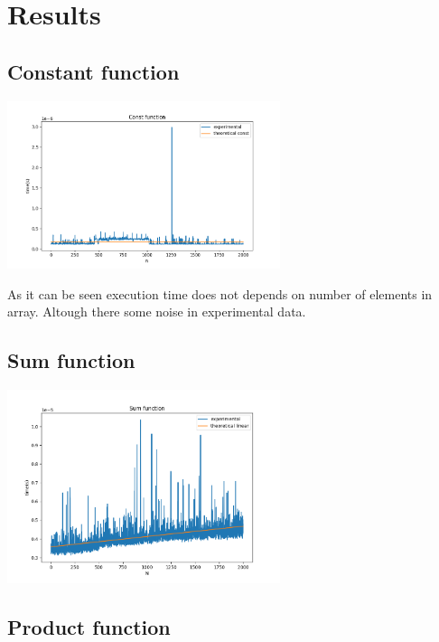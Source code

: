 \section*{Results}

\subsection*{Constant function}

\begin{center}
    \includegraphics[width=0.6\textwidth]{../results/const_f.png}
\end{center}

As it can be seen execution time does not depends on number of elements in array. Altough there some noise in experimental data.

\subsection*{Sum function}

\begin{center}
    \includegraphics[width=0.6\textwidth]{../results/sum_f.png}
\end{center}

\subsection*{Product function}

